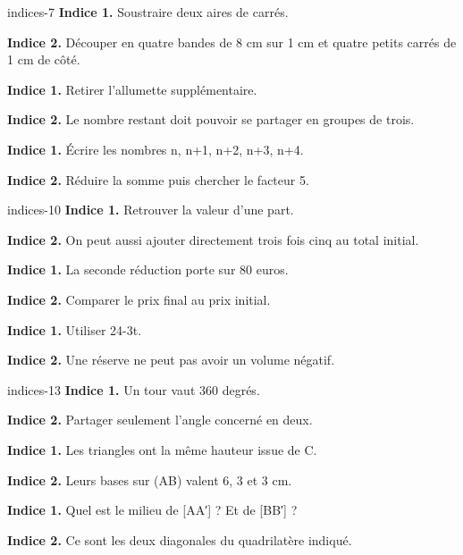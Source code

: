 \begin{blocEdition}{indices-7}
\textbf{Indice 1.} Soustraire deux aires de carrés.\par\medskip\textbf{Indice 2.} Découper en quatre bandes de 8 cm sur 1 cm et quatre petits carrés de 1 cm de côté.\par
{}\textbf{Indice 1.} Retirer l’allumette supplémentaire.\par\medskip\textbf{Indice 2.} Le nombre restant doit pouvoir se partager en groupes de trois.\par
{}\textbf{Indice 1.} Écrire les nombres n, n+1, n+2, n+3, n+4.\par\medskip\textbf{Indice 2.} Réduire la somme puis chercher le facteur 5.\par

\end{blocEdition}
\begin{blocEdition}{indices-10}
\textbf{Indice 1.} Retrouver la valeur d’une part.\par\medskip\textbf{Indice 2.} On peut aussi ajouter directement trois fois cinq au total initial.\par
{}\textbf{Indice 1.} La seconde réduction porte sur 80 euros.\par\medskip\textbf{Indice 2.} Comparer le prix final au prix initial.\par
{}\textbf{Indice 1.} Utiliser 24-3t.\par\medskip\textbf{Indice 2.} Une réserve ne peut pas avoir un volume négatif.\par

\end{blocEdition}
\begin{blocEdition}{indices-13}
\textbf{Indice 1.} Un tour vaut 360 degrés.\par\medskip\textbf{Indice 2.} Partager seulement l’angle concerné en deux.\par
{}\textbf{Indice 1.} Les triangles ont la même hauteur issue de C.\par\medskip\textbf{Indice 2.} Leurs bases sur (AB) valent 6, 3 et 3 cm.\par
{}\textbf{Indice 1.} Quel est le milieu de [AA′] ? Et de [BB′] ?\par\medskip\textbf{Indice 2.} Ce sont les deux diagonales du quadrilatère indiqué.\par

\end{blocEdition}

